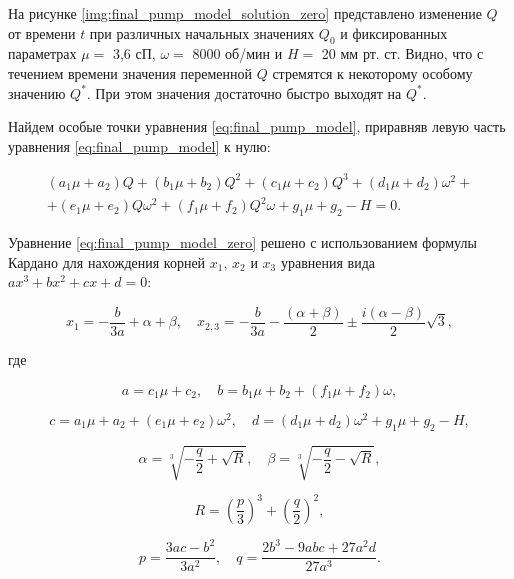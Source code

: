 На рисунке \ref{img:final_pump_model_solution_zero} представлено изменение $Q$ от времени $t$ при различных начальных значениях $Q_0$ и фиксированных параметрах $\mu = $ 3,6 сП, $\omega =$ 8000 об/мин и $H = $ 20 мм рт. ст. Видно, что с течением времени значения переменной $Q$ стремятся к некоторому особому значению $Q^*$. При этом значения достаточно быстро выходят на $Q^*$. 

Найдем особые точки уравнения \eqref{eq:final_pump_model}, приравняв левую часть уравнения \eqref{eq:final_pump_model} к нулю:

\begin{multline}
(a_1\mu+a_2)Q + (b_1\mu+b_2)Q^2 + (c_1\mu+c_2)Q^3 + (d_1\mu+d_2)\omega^2 + \\+ (e_1\mu+e_2)Q\omega^2 + (f_1\mu+f_2)Q^2\omega + g_1\mu+g_2 - H = 0.
\label{eq:final_pump_model_zero}
\end{multline}

Уравнение \eqref{eq:final_pump_model_zero} решено с использованием формулы Кардано для нахождения корней $x_1$, $x_2$ и $x_3$ уравнения вида $ax^3 + bx^2 + cx + d = 0$:

\begin{equation}
x_1 = -\frac{b}{3a} + \alpha + \beta, \quad x_{2, 3} = -\frac{b}{3a}  - \frac{(\alpha + \beta)}{2} \pm \frac{i(\alpha - \beta)}{2}\sqrt{3},
\label{eq:cardano_1}
\end{equation}

где 

\begin{equation}
a = c_1\mu + c_2, \quad b = b_1\mu + b_2 + (f_1\mu + f_2)\omega,
\label{eq:cardano_2_1}
\end{equation}

\begin{equation}
c = a_1\mu + a_2 + (e_1\mu + e_2)\omega^2, \quad d = (d_1\mu + d_2)\omega^2 + g_1\mu + g_2 - H,
\label{eq:cardano_2_2}
\end{equation}

\begin{equation}
\alpha = \sqrt[3]{-\frac{q}{2} + \sqrt{R}}, \quad \beta = \sqrt[3]{-\frac{q}{2} - \sqrt{R}},
\label{eq:cardano_2}
\end{equation}

\begin{equation}
R = \left(\frac{p}{3}\right)^3 + \left( \frac{q}{2} \right)^2,
\label{eq:cardano_3}
\end{equation}

\begin{equation}
p = \frac{3ac - b^2}{3a^2}, \quad q = \frac{2b^3 - 9abc + 27a^2d}{27a^3}.
\label{eq:cardano_extension}
\end{equation}

